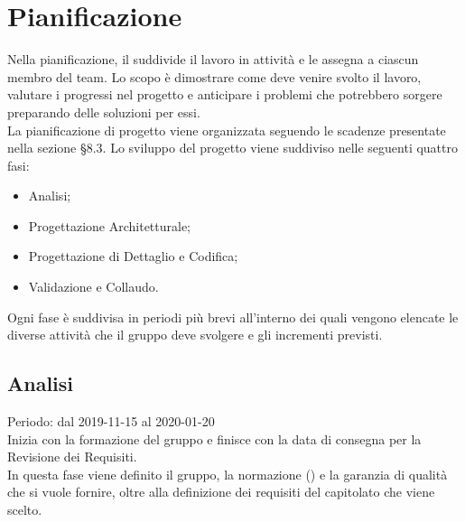 \section{Pianificazione}
Nella pianificazione, il \Responsabile{} suddivide il lavoro in attività e le assegna a ciascun membro del team.
Lo scopo è dimostrare come deve venire svolto il lavoro, valutare i progressi nel progetto e anticipare i problemi che potrebbero sorgere preparando delle soluzioni per essi.\\
La pianificazione di progetto viene organizzata seguendo le scadenze presentate nella sezione §8.3.
Lo sviluppo del progetto viene suddiviso nelle seguenti quattro fasi: 
\begin{itemize}
	\item Analisi;
	\item Progettazione Architetturale;
	\item Progettazione di Dettaglio e Codifica;
	\item Validazione e Collaudo.
\end{itemize}
Ogni fase è suddivisa in periodi più brevi all'interno dei quali vengono elencate le diverse attività che il gruppo \Gruppo{} deve svolgere e gli incrementi previsti.

\subsection{Analisi}
Periodo: dal 2019-11-15 al 2020-01-20\\
Inizia con la formazione del gruppo e finisce con la data di consegna per la Revisione dei Requisiti.\\
In questa fase viene definito il gruppo, la normazione () e la garanzia di qualità che si vuole fornire, oltre alla definizione dei requisiti del capitolato che viene scelto.

